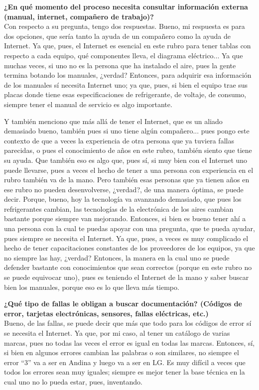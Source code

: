 {{    \textbf{¿En qué momento del proceso necesita consultar información externa (manual, internet, compañero de trabajo)?}\\
    Con respecto a su pregunta, tengo dos respuestas. Bueno, mi respuesta es para dos opciones, que sería tanto la ayuda de un compañero como la ayuda de Internet. Ya que, pues, el Internet es esencial en este rubro para tener tablas con respecto a cada equipo, qué componentes lleva, el diagrama eléctrico... Ya que muchas veces, si uno no es la persona que ha instalado el aire, pues la gente termina botando los manuales, ¿verdad? Entonces, para adquirir esa información de los manuales sí necesita Internet uno; ya que, pues, si bien el equipo trae sus placas donde tiene esas especificaciones de refrigerante, de voltaje, de consumo, siempre tener el manual de servicio es algo importante.

    Y también menciono que más allá de tener el Internet, que es un aliado demasiado bueno, también pues si uno tiene algún compañero... pues pongo este contexto de que a veces la experiencia de otra persona que ya tuviera fallas parecidas, o pues el conocimiento de años en este rubro, también siento que tiene su ayuda. Que también eso es algo que, pues sí, si muy bien con el Internet uno puede llevarse, pues a veces el hecho de tener a una persona con experiencia en el rubro también va de la mano. Pero también esas personas que ya tienen años en ese rubro no pueden desenvolverse, ¿verdad?, de una manera óptima, se puede decir. Porque, bueno, hoy la tecnología va avanzando demasiado, que pues los refrigerantes cambian, las tecnologías de la electrónica de los aires cambian bastante porque siempre van mejorando. Entonces, si bien es bueno tener ahí a una persona con la cual te puedas apoyar con una pregunta, que te pueda ayudar, pues siempre se necesita el Internet. Ya que, pues, a veces es muy complicado el hecho de tener capacitaciones constantes de los proveedores de los equipos, ya que no siempre las hay, ¿verdad? Entonces, la manera en la cual uno se puede defender bastante con conocimientos que sean correctos (porque en este rubro no se puede equivocar uno), pues es teniendo el Internet de la mano y saber buscar bien los manuales, porque eso es lo que lleva más tiempo.

    \textbf{¿Qué tipo de fallas le obligan a buscar documentación? (Códigos de error, tarjetas electrónicas, sensores, fallas eléctricas, etc.)}\\
    Bueno, de las fallas, se puede decir que más que todo para los códigos de error sí se necesita el Internet. Ya que, por mi caso, al tener un catálogo de varias marcas, pues no todas las veces el error es igual en todas las marcas. Entonces, sí, si bien en algunos errores cambian las palabras o son similares, no siempre el error ``3'' va a ser en Andina y luego va a ser en LG. Es muy difícil a veces que todos los errores sean muy iguales; siempre es mejor tener la base técnica en la cual uno no lo pueda estar, pues, inventando.

}}
